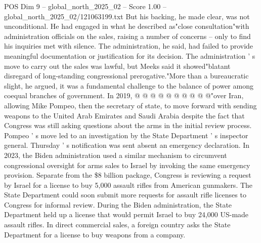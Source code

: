 \begin{textsample}{POS Dim 9 – global\_north\_2025\_02 – Score 1.00 – global\_north\_2025\_02/121063199.txt}
But his backing, he made clear, was not unconditional.
He had engaged in what he described as"close consultation"with administration officials on the sales, raising a number of concerns -- only to find his inquiries met with silence.
The administration, he said, had failed to provide meaningful documentation or justification for its decision.
The administration ' s move to carry out the sales was lawful, but Meeks said it showed"blatant disregard of long-standing congressional prerogative."More than a bureaucratic slight, he argued, it was a fundamental challenge to the balance of power among coequal branches of government.
In 2019, @ @ @ @ @ @ @ @ @ @"over Iran, allowing Mike Pompeo, then the secretary of state, to move forward with sending weapons to the United Arab Emirates and Saudi Arabia despite the fact that Congress was still asking questions about the arms in the initial review process.
Pompeo ' s move led to an investigation by the State Department ' s inspector general.
Thursday ' s notification was sent absent an emergency declaration.
In 2023, the Biden administration used a similar mechanism to circumvent congressional oversight for arms sales to Israel by invoking the same emergency provision.
Separate from the \$8 billion package, Congress is reviewing a request by Israel for a license to buy 5,000 assault rifles from American gunmakers.
The State Department could soon submit more requests for assault rifle licenses to Congress for informal review.
During the Biden administration, the State Department held up a license that would permit Israel to buy 24,000 US-made assault rifles.
In direct commercial sales, a foreign country asks the State Department for a license to buy weapons from a company.

\end{textsample}
